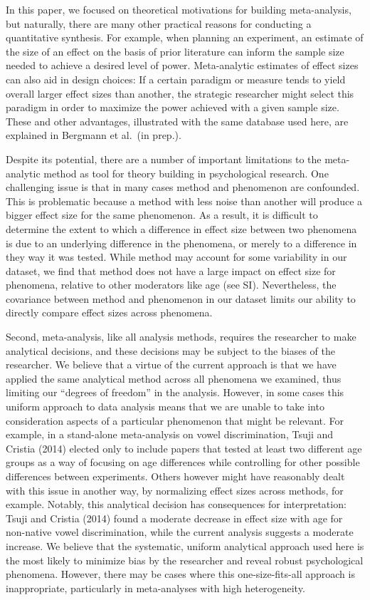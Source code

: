 \documentclass[9pt,twocolumn,twoside,lineno]{pnas-new}
\begin{document}
In this paper, we focused on theoretical motivations for building
meta-analysis, but naturally, there are many other practical reasons for
conducting a quantitative synthesis. For example, when planning an
experiment, an estimate of the size of an effect on the basis of prior
literature can inform the sample size needed to achieve a desired level
of power. Meta-analytic estimates of effect sizes can also aid in design
choices: If a certain paradigm or measure tends to yield overall larger
effect sizes than another, the strategic researcher might select this
paradigm in order to maximize the power achieved with a given sample
size. These and other advantages, illustrated with the same database
used here, are explained in Bergmann et al.~(in prep.).

Despite its potential, there are a number of important limitations to
the meta-analytic method as tool for theory building in psychological
research. One challenging issue is that in many cases method and
phenomenon are confounded. This is problematic because a method with
less noise than another will produce a bigger effect size for the same
phenomenon. As a result, it is difficult to determine the extent to
which a difference in effect size between two phenomena is due to an
underlying difference in the phenomena, or merely to a difference in
they way it was tested. While method may account for some variability in
our dataset, we find that method does not have a large impact on effect
size for phenomena, relative to other moderators like age (see SI).
Nevertheless, the covariance between method and phenomenon in our
dataset limits our ability to directly compare effect sizes across
phenomena.

Second, meta-analysis, like all analysis methods, requires the
researcher to make analytical decisions, and these decisions may be
subject to the biases of the researcher. We believe that a virtue of the
current approach is that we have applied the same analytical method
across all phenomena we examined, thus limiting our \enquote{degrees of
freedom} in the analysis. However, in some cases this uniform approach
to data analysis means that we are unable to take into consideration
aspects of a particular phenomenon that might be relevant. For example,
in a stand-alone meta-analysis on vowel discrimination, Tsuji and
Cristia (2014) elected only to include papers that tested at least two
different age groups as a way of focusing on age differences while
controlling for other possible differences between experiments. Others
however might have reasonably dealt with this issue in another way, by
normalizing effect sizes across methods, for example. Notably, this
analytical decision has consequences for interpretation: Tsuji and
Cristia (2014) found a moderate decrease in effect size with age for
non-native vowel discrimination, while the current analysis suggests a
moderate increase. We believe that the systematic, uniform analytical
approach used here is the most likely to minimize bias by the researcher
and reveal robust psychological phenomena. However, there may be cases
where this one-size-fits-all approach is inappropriate, particularly in
meta-analyses with high heterogeneity.
\end{document}
